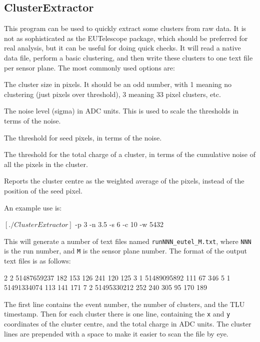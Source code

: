 \subsection{ClusterExtractor}
\label{sec:ClusterExtractor}
This program can be used to quickly extract some clusters from raw data.
It is not as sophisticated as the EUTelescope package, which should be preferred for real analysis,
but it can be useful for doing quick checks.
It will read a native data file, perform a basic clustering,
and then write these clusters to one text file per sensor plane.
The most commonly used options are:
\begin{description}
The cluster size in pixels.
It should be an odd number, with 1 meaning no clustering (just pixels over threshold),
3 meaning 3\x{}3 pixel clusters, etc.

The noise level (sigma) in ADC units.
This is used to scale the thresholds in terms of the noise.

The threshold for seed pixels, in terms of the noise.

The threshold for the total charge of a cluster,
in terms of the cumulative noise of all the pixels in the cluster.

Reports the cluster centre as the weighted average of the pixels,
instead of the position of the seed pixel.

\end{description}

An example use is:
\begin{listing}[mybash]
$[./ClusterExtractor]$ -p 3 -n 3.5 -s 6 -c 10 -w 5432
\end{listing}

This will generate a number of text files named \texttt{runNNN\_eutel\_M.txt},
where \texttt{NNN} is the run number, and \texttt{M} is the sensor plane number.
The format of the output text files is as follows:
\begin{listing}[]
2       2       51487659237
 182    153     126
 241    120     125
3       1       51489095892
 111    67      346
5       1       51491334074
 113    141     171
7       2       51495330212
 252    240     305
 95     170     189
\end{listing}

The first line contains the event number,
the number of clusters, and the TLU timestamp.
Then for each cluster there is one line,
containing the \texttt{x} and \texttt{y} coordinates of the cluster centre,
and the total charge in ADC units.
The cluster lines are prepended with a space to make it easier to scan the file by eye.


